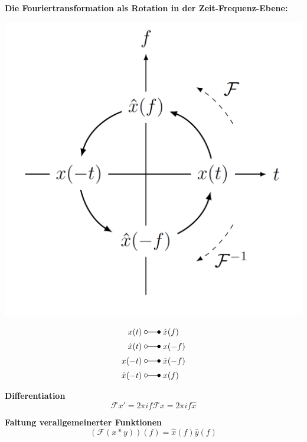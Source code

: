 \textbf{Die Fouriertransformation als Rotation in der Zeit-Frequenz-Ebene:}
\begin{center}
    \includegraphics[width=0.6\linewidth]{img/FT_Rotation.png}
\end{center}
\begin{align*}
    x(t) \;       & \laplace\; \hat{x}(f)  \\
    \hat{x}(t) \; & \laplace\; x(-f)       \\
    x(-t) \;      & \laplace\; \hat{x}(-f) \\
    \hat{x}(-t)\; & \laplace\; x(f)
\end{align*}

\textbf{Differentiation}
\begin{equation}
    \mathcal{F}x'=2\pi if\mathcal{F}x=2\pi if\hat{x}
\end{equation}

\textbf{Faltung verallgemeinerter Funktionen}
\begin{equation}
    (\mathcal{F}(x*y))(f) = \hat{x}(f)\hat{y}(f)
\end{equation}